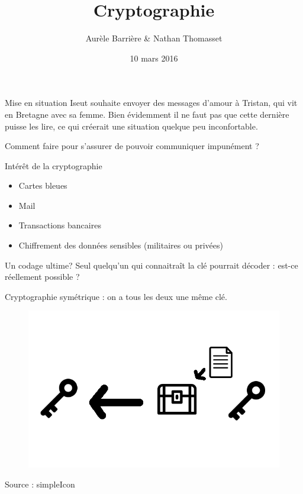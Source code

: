 \documentclass{beamer}
\author{Aurèle Barrière \& Nathan Thomasset}
\title{Cryptographie}
\date{10 mars 2016}
\begin{document}
\begin{frame}
\maketitle
\end{frame}

\begin{frame}{Mise en situation}
  Iseut souhaite envoyer des messages d'amour à Tristan, qui vit en Bretagne avec sa femme. Bien évidemment il ne faut pas que cette dernière puisse les lire, ce qui créerait une situation quelque peu inconfortable.
  \begin{block}{}
   Comment faire pour s'assurer de pouvoir communiquer impunément ?
   \end{block}

  \end{frame}

\begin{frame}{Intérêt de la cryptographie}
  \begin{itemize}
  \item Cartes bleues
    
  \item Mail
    
  \item Transactions bancaires
  
  \item Chiffrement des données sensibles (militaires ou privées)
\end{itemize}
\end{frame}

\begin{frame}{Un codage ultime?}
  Seul quelqu'un qui connaitraît la clé pourrait décoder : est-ce réellement possible ?

Cryptographie symétrique : on a tous les deux une même clé.
\begin{figure}
\centering
\includegraphics[scale = 0.4]{symetric.png}

\end{figure}
\footnotesize{Source : simpleIcon}
  \end{frame}
\end{document}
